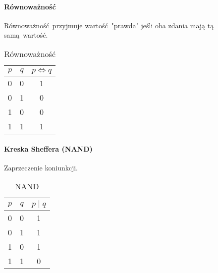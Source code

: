         \paragraph{Równoważność}
        Równoważność przyjmuje wartość "prawda" jeśli oba zdania mają tą samą wartość.
        \begin{table}[h!]
            \begin{center}
                \caption{Równoważność}
                \label{tab:tabela5}
                \begin{tabular}{c|c|c}
                    \textbf{$p$} & \textbf{$q$} & \textbf{$p \Leftrightarrow q$} \\
                    \midrule
                    0 & 0 & 1\\
                    0 & 1 & 0\\
                    1 & 0 & 0\\
                    1 & 1 & 1\\
                    \bottomrule
                \end{tabular}
            \end{center}
        \end{table}
        
        \paragraph{Kreska Sheffera (NAND)}
        Zaprzeczenie koniunkcji.
        \begin{table}[h!]
            \begin{center}
                \caption{NAND}
                \label{tab:tabela6}
                \begin{tabular}{c|c|c}
                    \textbf{$p$} & \textbf{$q$} & \textbf{$p \mid q$} \\
                    \midrule
                    0 & 0 & 1\\
                    0 & 1 & 1\\
                    1 & 0 & 1\\
                    1 & 1 & 0\\
                    \bottomrule
                \end{tabular}
            \end{center}
        \end{table}
        
